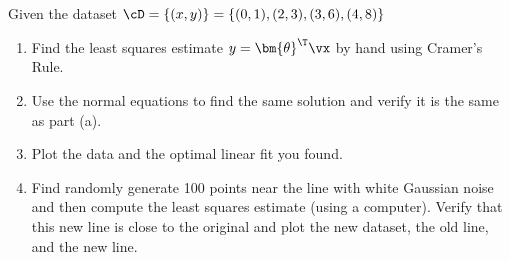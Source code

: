 \documentclass[189]{pset}
\begin{document}
  \section{}
    Given the dataset $\cD = \{(x,y)\} = \{(0,1), (2,3), (3,6), (4,8)\}$
    \begin{enumerate}
      \item Find the least squares estimate $y = {\bm{\theta}}^\T\vx$ by
        hand using Cramer's Rule.
      \item Use the normal equations to find the same solution and
        verify it is the same as part (a).
      \item Plot the data and the optimal linear fit you found.
      \item Find randomly generate 100 points near the line with white
        Gaussian noise and then compute the least squares estimate
        (using a computer). Verify that this new line is close to the
        original and plot the new dataset, the old line, and the new
        line.
    \end{enumerate}

  \hrulefill
\end{document}
